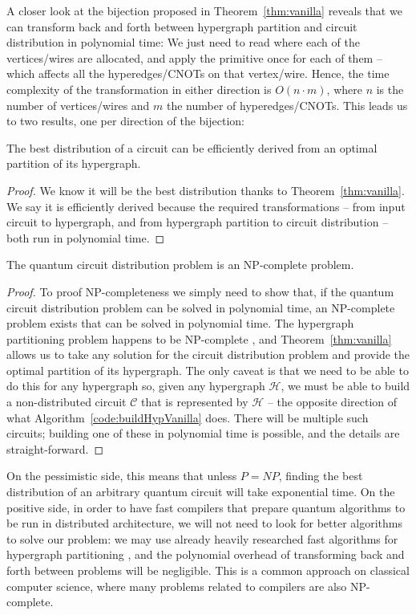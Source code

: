 A closer look at the bijection proposed in Theorem~\ref{thm:vanilla} reveals that we can transform back and forth between hypergraph partition and circuit distribution in polynomial time: We just need to read where each of the vertices/wires are allocated, and apply the primitive once for each of them -- which affects all the hyperedges/CNOTs on that vertex/wire. Hence, the time complexity of the transformation in either direction is \(O(n\cdot m)\), where \(n\) is the number of vertices/wires and \(m\) the number of hyperedges/CNOTs. This leads us to two results, one per direction of the bijection:

\begin{corollary} The best distribution of a circuit can be efficiently derived from an optimal partition of its hypergraph.
\end{corollary} \begin{proof}
We know it will be the best distribution thanks to Theorem~\ref{thm:vanilla}. We say it is efficiently derived because the required transformations -- from input circuit to hypergraph, and from hypergraph partition to circuit distribution -- both run in polynomial time.

\end{proof}

\begin{corollary} The quantum circuit distribution problem is an NP-complete problem.
\end{corollary} \begin{proof}
To proof NP-completeness we simply need to show that, if the quantum circuit distribution problem can be solved in polynomial time, an NP-complete problem exists that can be solved in polynomial time. The hypergraph partitioning problem happens to be NP-complete \citep{NP-complete}, and Theorem~\ref{thm:vanilla} allows us to take any solution for the circuit distribution problem and provide the optimal partition of its hypergraph. The only caveat is that we need to be able to do this for any hypergraph so, given any hypergraph \(\mathcal{H}\), we must be able to build a non-distributed circuit \(\mathcal{C}\) that is represented by \(\mathcal{H}\) -- the opposite direction of what Algorithm~\ref{code:buildHypVanilla} does. There will be multiple such circuits; building one of these in polynomial time is possible, and the details are straight-forward.

\end{proof}

On the pessimistic side, this means that unless \(P=NP\), finding the best distribution of an arbitrary quantum circuit will take exponential time. On the positive side, in order to have fast compilers that prepare quantum algorithms to be run in distributed architecture, we will not need to look for better algorithms to solve our problem: we may use already heavily researched fast algorithms for hypergraph partitioning \citep{KaHyPart}, and the polynomial overhead of transforming back and forth between problems will be negligible. This is a common approach on classical computer science, where many problems related to compilers are also NP-complete.


